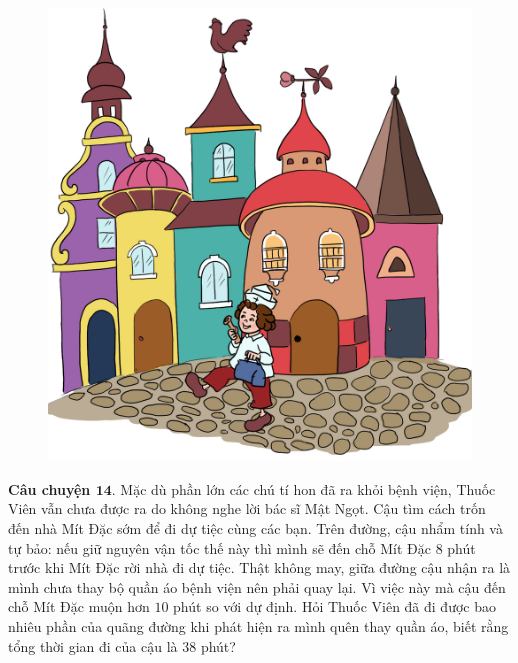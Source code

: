 	\begin{figure}
		\centering
		\vspace*{-5pt}
		\captionsetup{labelformat= empty, justification=centering}
		\includegraphics[width=1\linewidth]{Hinh16_ThuocNuoc}
		\vspace*{-10pt}
	\end{figure}
	\textbf{\color{toancuabi}Câu chuyện $\pmb{14.}$} Mặc dù phần lớn các chú tí hon đã ra khỏi bệnh viện, Thuốc Viên vẫn chưa được ra do không nghe lời bác sĩ Mật Ngọt. Cậu tìm cách trốn đến nhà Mít Đặc sớm để đi dự tiệc cùng các bạn. Trên đường, cậu nhẩm tính và tự bảo: nếu giữ nguyên vận tốc thế này thì mình sẽ đến chỗ Mít Đặc $8$ phút trước khi Mít Đặc rời nhà đi dự tiệc. Thật không may, giữa đường cậu nhận ra là mình chưa thay bộ quần áo bệnh viện nên phải quay lại. Vì việc này mà cậu đến chỗ Mít Đặc muộn hơn $10$ phút so với dự định. Hỏi Thuốc Viên đã đi được bao nhiêu phần của quãng đường khi phát hiện ra mình quên thay quần áo, biết rằng tổng thời gian đi của cậu là $38$ phút?
		

